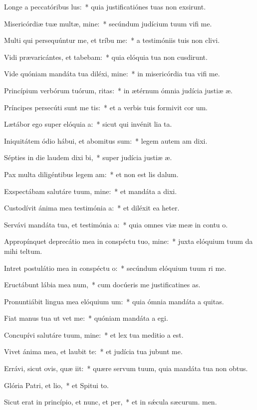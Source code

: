 \item Longe a peccatóribus lus:~* quia justificatiónes tuas non exsirunt.
\item Misericórdiæ tuæ multæ, mine:~* secúndum judícium tuum vifi me.
\item Multi qui persequúntur me, et tríbu me:~* a testimóniis tuis non clivi.
\item Vidi prævaricántes, et tabebam:~* quia elóquia tua non cusdirunt.
\item Vide quóniam mandáta tua diléxi, mine:~* in misericórdia tua vifi me.
\item Princípium verbórum tuórum, ritas:~* in ætérnum ómnia judícia justiæ æ.
\item Príncipes persecúti sunt me tis:~* et a verbis tuis formivit cor um.
\item Lætábor ego super elóquia a:~* sicut qui invénit lia ta.
\item Iniquitátem ódio hábui, et abomitus sum:~* legem autem am dixi.
\item Sépties in die laudem dixi bi,~* super judícia justiæ æ.
\item Pax multa diligéntibus legem am:~* et non est lis dalum.
\item Exspectábam salutáre tuum, mine:~* et mandáta a dixi.
\item Custodívit ánima mea testimónia a:~* et diléxit ea heter.
\item Servávi mandáta tua, et testimónia a:~* quia omnes viæ meæ in contu o.
\item Appropínquet deprecátio mea in conspéctu tuo, mine:~* juxta elóquium tuum da mihi teltum.
\item Intret postulátio mea in conspéctu o:~* secúndum elóquium tuum ri me.
\item Eructábunt lábia mea num,~* cum docúeris me justificatines as.
\item Pronuntiábit lingua mea elóquium um:~* quia ómnia mandáta a quitas.
\item Fiat manus tua ut vet me:~* quóniam mandáta a egi.
\item Concupívi salutáre tuum, mine:~* et lex tua meditio a est.
\item Vivet ánima mea, et laubit te:~* et judícia tua jubunt me.
\item Errávi, sicut ovis, quæ iit:~* quære servum tuum, quia mandáta tua non  obtus.
\item Glória Patri, et lio,~* et Spitui to.
\item Sicut erat in princípio, et nunc, et per,~* et in sǽcula sæcurum. men.
